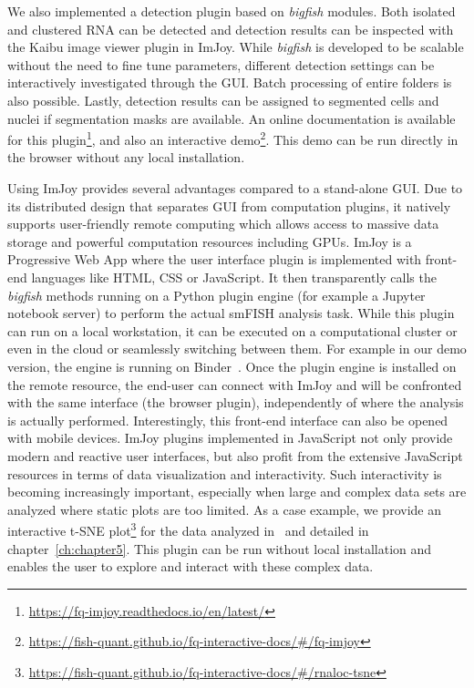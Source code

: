 We also implemented a detection plugin based on \emph{bigfish} modules.
Both isolated and clustered \ac{RNA} can be detected and detection results can be inspected with the Kaibu image viewer plugin in ImJoy.
While \emph{bigfish} is developed to be scalable without the need to fine tune parameters, different detection settings can be interactively investigated through the \ac{GUI}.
Batch processing of entire folders is also possible.
Lastly, detection results can be assigned to segmented cells and nuclei if segmentation masks are available.
An online documentation is available for this plugin\footnote{\url{https://fq-imjoy.readthedocs.io/en/latest/}}, and also an interactive demo\footnote{\url{https://fish-quant.github.io/fq-interactive-docs/\#/fq-imjoy}}.
This demo can be run directly in the browser without any local installation.

Using ImJoy provides several advantages compared to a stand-alone \ac{GUI}.
Due to its distributed design that separates \ac{GUI} from computation plugins, it natively supports user-friendly remote computing which allows access to massive data storage and powerful computation resources including GPUs.
ImJoy is a Progressive Web App where the user interface plugin is implemented with front-end languages like HTML, CSS or JavaScript.
It then transparently calls the \emph{bigfish} methods running on a Python plugin engine (for example a Jupyter notebook server) to perform the actual \ac{smFISH} analysis task.
While this plugin can run on a local workstation, it can be executed on a computational cluster or even in the cloud or seamlessly switching between them.
For example in our demo version, the engine is running on Binder~\cite{Jupyter2018Binder2}.
Once the plugin engine is installed on the remote resource, the end-user can connect with ImJoy and will be confronted with the same interface (the browser plugin), independently of where the analysis is actually performed.
Interestingly, this front-end interface can also be opened with mobile devices.
ImJoy plugins implemented in JavaScript not only provide modern and reactive user interfaces, but also profit from the extensive JavaScript resources in terms of data visualization and interactivity.
Such interactivity is becoming increasingly important, especially when large and complex data sets are analyzed where static plots are too limited.
As a case example, we provide an interactive t-SNE plot\footnote{\url{https://fish-quant.github.io/fq-interactive-docs/\#/rnaloc-tsne}} for the data analyzed in~\cite{CHOUAIB_2020} and detailed in chapter~\ref{ch:chapter5}.
This plugin can be run without local installation and enables the user to explore and interact with these complex data.

